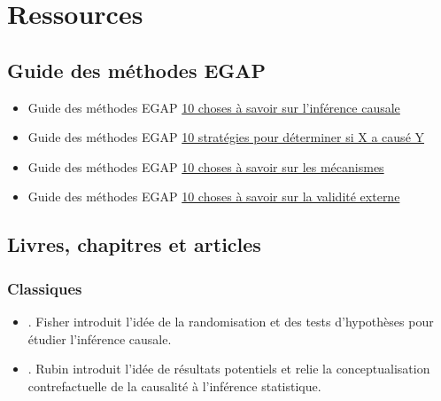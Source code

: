 \documentclass[
  12pt,
]{book}
\begin{document}
\hypertarget{ressources-1}{%
\section{Ressources}\label{ressources-1}}

\hypertarget{guide-des-muxe9thodes-egap-1}{%
\subsection{Guide des méthodes EGAP}\label{guide-des-muxe9thodes-egap-1}}

\begin{itemize}
\item
  Guide des méthodes EGAP \href{https://egap.org/resource/10-things-to-know-about-causal-inference/}{10 choses à savoir sur l'inférence causale}
\item
  Guide des méthodes EGAP \href{https://egap.org/resource/10-strategies-figuring-out-if-x-caused-y/}{10 stratégies pour déterminer si X a causé Y}
\item
  Guide des méthodes EGAP \href{https://egap.org/resource/10-things-mechanisms/}{10 choses à savoir sur les mécanismes}
\item
  Guide des méthodes EGAP \href{https://egap.org/resource/10-things-to-know-about-external-validity/}{10 choses à savoir sur la validité externe}
\end{itemize}

\hypertarget{causalinference-cites}{%
\subsection{Livres, chapitres et articles}\label{causalinference-cites}}

\hypertarget{causalinference-classics}{%
\subsubsection{Classiques}\label{causalinference-classics}}

\begin{itemize}
\item
  \autocite{fisher_design_1935}. Fisher introduit l'idée de la randomisation et des tests d'hypothèses pour étudier l'inférence causale.
\item
  \autocite{rubin:1974}. Rubin introduit l'idée de résultats potentiels et relie la conceptualisation contrefactuelle de la causalité à l'inférence statistique.
\end{itemize}
\end{document}

